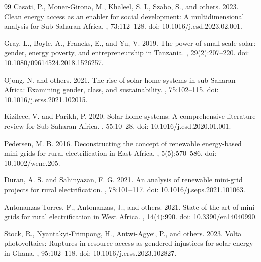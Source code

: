 \documentclass[12pt,a4paper]{article}
\begin{document}
\begin{thebibliography}{99}
Casati, P., Moner-Girona, M., Khaleel, S. I., Szabo, S., and others. 2023.
\newblock Clean energy access as an enabler for social development: {A} multidimensional analysis for {S}ub-{S}aharan {A}frica.
, 73:112--128.
\newblock doi: 10.1016/j.esd.2023.02.001.

Gray, L., Boyle, A., Francks, E., and Yu, V. 2019.
\newblock The power of small-scale solar: {g}ender, energy poverty, and entrepreneurship in {T}anzania.
, 29(2):207--220.
\newblock doi: 10.1080/09614524.2018.1526257.

Ojong, N. and others. 2021.
\newblock The rise of solar home systems in sub-{S}aharan {A}frica: {E}xamining gender, class, and sustainability.
, 75:102--115.
\newblock doi: 10.1016/j.erss.2021.102015.

Kizilcec, V. and Parikh, P. 2020.
\newblock Solar home systems: {A} comprehensive literature review for {S}ub-{S}aharan {A}frica.
, 55:10--28.
\newblock doi: 10.1016/j.esd.2020.01.001.

Pedersen, M. B. 2016.
\newblock Deconstructing the concept of renewable energy-based mini-grids for rural electrification in {E}ast {A}frica.
, 5(5):570--586.
\newblock doi: 10.1002/wene.205.

Duran, A. S. and Sahinyazan, F. G. 2021.
\newblock An analysis of renewable mini-grid projects for rural electrification.
, 78:101--117.
\newblock doi: 10.1016/j.seps.2021.101063.

Antonanzas-Torres, F., Antonanzas, J., and others. 2021.
\newblock State-of-the-art of mini grids for rural electrification in {W}est {A}frica.
, 14(4):990.
\newblock doi: 10.3390/en14040990.

Stock, R., Nyantakyi-Frimpong, H., Antwi-Agyei, P., and others. 2023.
\newblock Volta photovoltaics: {R}uptures in resource access as gendered injustices for solar energy in {G}hana.
, 95:102--118.
\newblock doi: 10.1016/j.erss.2023.102827.


\end{thebibliography}
\end{document}
